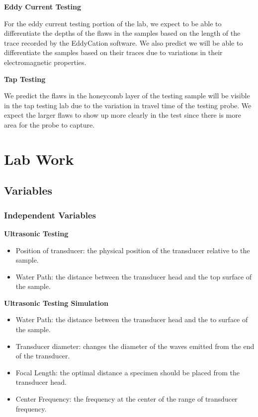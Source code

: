 \documentclass[12 pt]{report}
\begin{document}
\textbf{Eddy Current Testing}

For the eddy current testing portion of the lab, we expect to be able to differentiate the depths of the flaws in the samples based on the length of the trace recorded by the EddyCation software. We also predict we will be able to differentiate the samples based on their traces due to variations in their electromagnetic properties.

\textbf{Tap Testing}

We predict the flaws in the honeycomb layer of the testing sample will be visible in the tap testing lab due to the variation in travel time of the testing probe. We expect the larger flaws to show up more clearly in the test since there is more area for the probe to capture.

\chapter{Lab Work} \label{lab_work}
\section{Variables} \label{variables}
\subsection{Independent Variables} \label{variables-independent_variables}
\textbf{Ultrasonic Testing}

\begin{itemize}
	\item Position of transducer: the physical position of the transducer relative to the sample.
	\item Water Path: the distance between the transducer head and the top surface of the sample.
\end{itemize}

\textbf{Ultrasonic Testing Simulation}

\begin{itemize}
	\item Water Path: the distance between the transducer head and the to surface of the sample.
	\item Transducer diameter: changes the diameter of the waves emitted from the end of the transducer.
	\item Focal Length: the optimal distance a specimen should be placed from the transducer head.
	\item Center Frequency: the frequency at the center of the range of transducer frequency.
\end{itemize}
\end{document}
